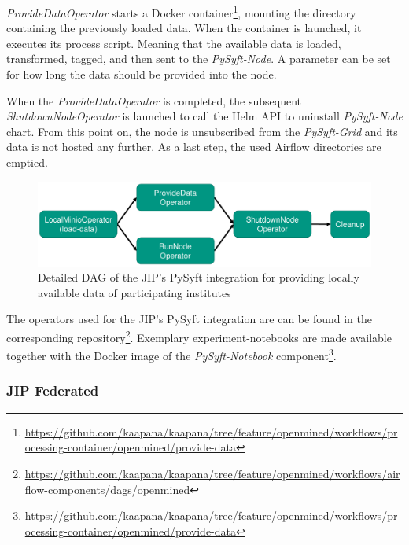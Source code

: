 \textit{ProvideDataOperator} starts a Docker container\footnote{\url{https://github.com/kaapana/kaapana/tree/feature/openmined/workflows/processing-container/openmined/provide-data}}, mounting the directory containing the previously loaded data. When the container is launched, it executes its process script. Meaning that the available data is loaded, transformed, tagged, and then sent to the \textit{PySyft-Node}. A parameter can be set for how long the data should be provided into the node.

When the \textit{ProvideDataOperator} is completed, the subsequent \textit{ShutdownNodeOperator} is launched to call the Helm API to uninstall \textit{PySyft-Node} chart.
From this point on, the node is unsubscribed from the \textit{PySyft-Grid} and its data is not hosted any further. As a last step, the used Airflow directories are emptied.

\begin{figure}[htbp!]
    \centerline{\includegraphics[width=1\textwidth]{1_Figures/DAG_PySyft.pdf}}
    \caption[Detailed illustration of DAG for the JIP's PySyft integration]{Detailed DAG of the JIP's PySyft integration for providing locally available data of participating institutes}
\label{fig:DetailedDAG_PySyft}
\end{figure}

The operators used for the JIP's PySyft integration are can be found in the corresponding repository\footnote{\url{https://github.com/kaapana/kaapana/tree/feature/openmined/workflows/airflow-components/dags/openmined}}.
Exemplary experiment-notebooks are made available together with the Docker image of the \textit{PySyft-Notebook} component\footnote{\url{https://github.com/kaapana/kaapana/tree/feature/openmined/workflows/processing-container/openmined/provide-data}}.



\subsubsection{JIP Federated}
\label{subsubsec:JIPFederated}

